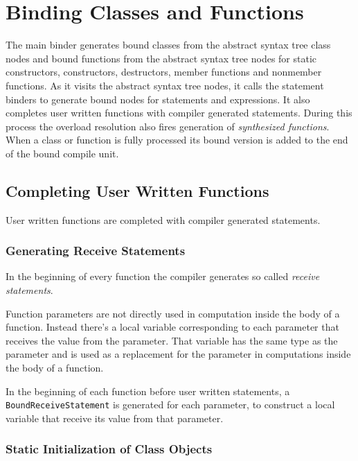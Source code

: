 \documentclass[a4paper,oneside,11pt]{book}
\theoremstyle{definition}
\begin{document}
\chapter{Binding Classes and Functions}\label{bindingclassesandfunctions}

The main binder generates bound classes from the abstract syntax tree class nodes and bound functions from the abstract syntax tree nodes for
static constructors, constructors, destructors, member functions and nonmember functions.
As it visits the abstract syntax tree nodes, it calls the statement binders to generate bound nodes for statements and expressions.
It also completes user written functions with compiler generated statements.
During this process the overload resolution also fires generation of \emph{synthesized functions}.
When a class or function is fully processed its bound version is added to the end of the bound compile unit.

\section{Completing User Written Functions}

User written functions are completed with compiler generated statements.

\subsection{Generating Receive Statements}\label{receives}

In the beginning of every function the compiler generates so called \emph{receive statements}.

Function parameters are not directly used in computation inside the body of a function.
Instead there's a local variable corresponding to each parameter that receives the value from the parameter.
That variable has the same type as the parameter and is used as a replacement for the parameter in computations inside the body of a function.

In the beginning of each function before user written statements,
a \verb|BoundReceiveStatement| is generated for each parameter, to construct a local variable that receive its value from that parameter.

\subsection{Static Initialization of Class Objects}
\end{document}

